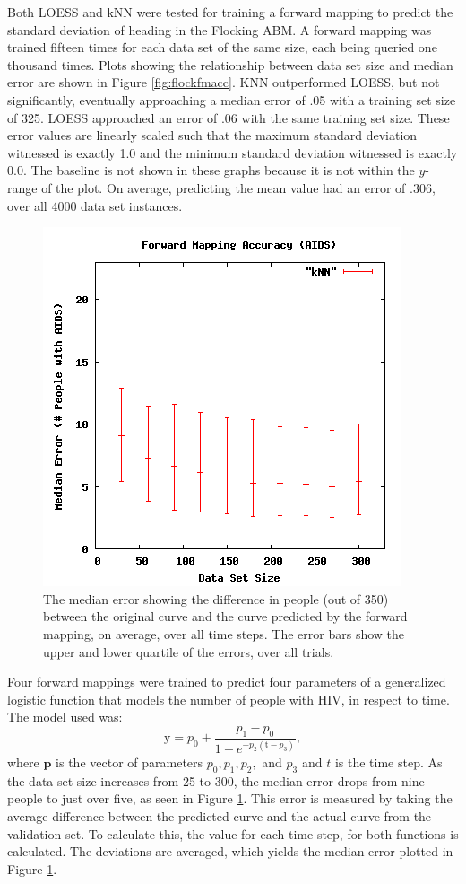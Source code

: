 Both LOESS and kNN were tested for training a forward mapping to predict the standard deviation of heading in the Flocking ABM.
A forward mapping was trained fifteen times for each data set of the same size, each being queried one thousand times.
Plots showing the relationship between data set size and median error are shown in Figure \ref{fig:flockfmacc}. 
KNN outperformed LOESS, but not significantly, eventually approaching a median error of .05 with a training set size of 325.
LOESS approached an error of .06 with the same training set size.
These error values are linearly scaled such that the maximum standard deviation witnessed is exactly 1.0 and the minimum standard deviation witnessed is exactly 0.0.
The baseline is not shown in these graphs because it is not within the $y$-range of the plot.
On average, predicting the mean value had an error of .306, over all 4000 data set instances.


\begin{figure}[ht]
\centering
\includegraphics[scale=.5]{images/results_aids/aids-fmacc.png}
\caption{The median error showing the difference in people  (out of 350) between the original curve and the curve predicted by the forward mapping, on average, over all time steps.
The error bars show the upper and lower quartile of the errors, over all trials.}
\label{fig:aidsfmacc}
\end{figure}

Four forward mappings were trained to predict four parameters of a generalized logistic function that models the number of people with HIV, in respect to time.
The model used was:
\[ \mathrm{y} = p_0 + \displaystyle \frac{p_1 - p_0}{1 + e ^ {-p_2  (\mathrm{t} - p_3) } }, \]
where $\mathbf p$ is the vector of parameters $p_0, p_1, p_2,$ and $p_3$ and $t$ is the time step.
As the data set size increases from 25 to 300, the median error drops from nine people to just over five, as seen in Figure \ref{fig:aidsfmacc}.
This error is measured by taking the average difference between the predicted curve and the actual curve from the validation set.
To calculate this, the value for each time step, for both functions is calculated.
The deviations are averaged, which yields the median error plotted in Figure \ref{fig:aidsfmacc}.

